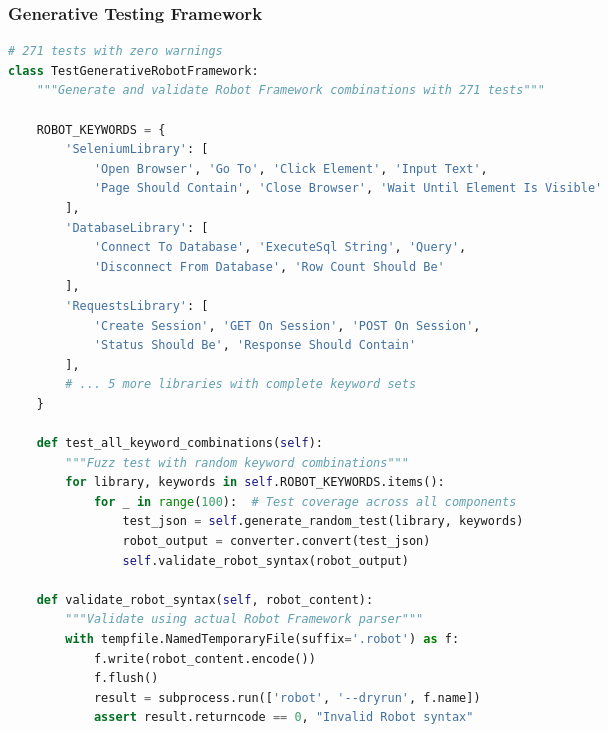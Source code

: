 \begin{frame}[fragile,t]
\frametitle{Generative Testing Framework}
\begin{adjustbox}{max width=\textwidth, max height=\textheight,keepaspectratio}
\begin{lstlisting}[language=Python,basicstyle=\fontsize{5}{6}\selectfont\ttfamily]
# 271 tests with zero warnings
class TestGenerativeRobotFramework:
    """Generate and validate Robot Framework combinations with 271 tests"""

    ROBOT_KEYWORDS = {
        'SeleniumLibrary': [
            'Open Browser', 'Go To', 'Click Element', 'Input Text',
            'Page Should Contain', 'Close Browser', 'Wait Until Element Is Visible'
        ],
        'DatabaseLibrary': [
            'Connect To Database', 'ExecuteSql String', 'Query',
            'Disconnect From Database', 'Row Count Should Be'
        ],
        'RequestsLibrary': [
            'Create Session', 'GET On Session', 'POST On Session',
            'Status Should Be', 'Response Should Contain'
        ],
        # ... 5 more libraries with complete keyword sets
    }

    def test_all_keyword_combinations(self):
        """Fuzz test with random keyword combinations"""
        for library, keywords in self.ROBOT_KEYWORDS.items():
            for _ in range(100):  # Test coverage across all components
                test_json = self.generate_random_test(library, keywords)
                robot_output = converter.convert(test_json)
                self.validate_robot_syntax(robot_output)

    def validate_robot_syntax(self, robot_content):
        """Validate using actual Robot Framework parser"""
        with tempfile.NamedTemporaryFile(suffix='.robot') as f:
            f.write(robot_content.encode())
            f.flush()
            result = subprocess.run(['robot', '--dryrun', f.name])
            assert result.returncode == 0, "Invalid Robot syntax"
\end{lstlisting}
\end{adjustbox}
\end{frame}

